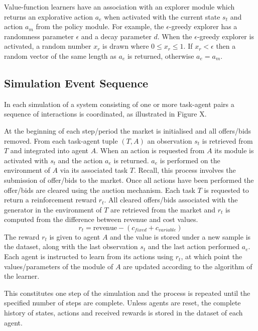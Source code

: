 Value-function learners have an association with an explorer module which
returns an explorative action $a_e$ when activated with the current state $s_t$
and action $a_m$ from the policy module.  For example, the $\epsilon$-greedy
explorer has a randomness parameter $\epsilon$ and a decay parameter $d$.  When
the $\epsilon$-greedy explorer is activated, a random number $x_r$ is drawn
where $0 \leq x_r \leq 1$.  If $x_r < \epsilon$ then a random vector of the same
length as $a_e$ is returned, otherwise $a_e = a_m$.

\subsection{Simulation Event Sequence}

In each simulation of a system consisting of one or more task-agent pairs a
sequence of interactions is coordinated, as illustrated in Figure X.

At the beginning of each step/period the market is initialised and all
offers/bids removed.  From each task-agent tuple $(T,A)$ an observation $s_t$
is retrieved from $T$ and integrated into agent $A$.  When an action is
requested from $A$ its module is activated with $s_t$ and the action $a_e$ is
returned.  $a_e$ is performed on the environment of $A$ via its associated task
$T$.  Recall, this process involves the submission of offer/bids to the market.
Once all actions have been performed the offer/bids are cleared using the
auction mechanism.  Each task $T$ is requested to return a reinforcement reward
$r_t$. All cleared offers/bids associated with the generator in the environment
of $T$ are retrieved from the market and $r_t$ is computed from the difference
between revenue and cost values.
\begin{equation}
r_t = \mbox{revenue} - (c_{fixed} + c_{variable})
\end{equation}
The reward $r_t$ is given to agent $A$ and the value is stored under a new
sample is the dataset, along with the last observation $s_t$ and the last action
performed $a_e$.  Each agent is instructed to learn from its actions using
$r_t$, at which point the values/parameters of the module of $A$ are updated
according to the algorithm of the learner.



This constitutes one step of the simulation and the process is repeated until
the specified number of steps are complete.  Unless agents are reset, the
complete history of states, actions and received rewards is stored in the
dataset of each agent.

